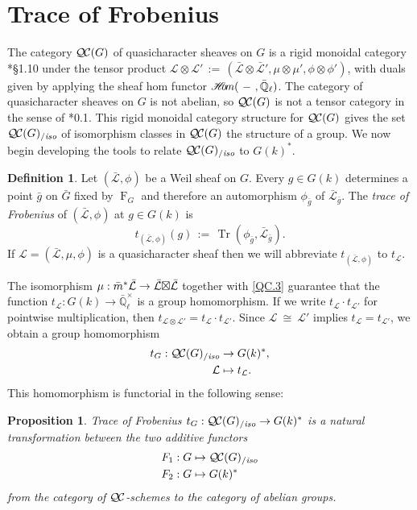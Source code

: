 \documentclass[11pt]{amsart}
\theoremstyle{plain}
\newtheorem{proposition}[theorem]{Proposition}
\theoremstyle{definition}
\newtheorem{definition}[theorem]{Definition}
\theoremstyle{remark}
\newcommand{\EE}{\mathbb{\bar Q}_\ell}
\newcommand{\Fq}{k}
\newcommand{\EEx}{\EE^\times}
\newcommand{\Frob}[1]{\operatorname{F}_{#1}}
\DeclareMathOperator{\trace}{Tr}
\newcommand{\cdef}[1]{{#1}\index{#1}}
\newcommand{\sheafHom}{{\mathscr{H}\hskip-4pt{\it o}\hskip-2pt{\it m}}}
\newcommand{\ceq}{{\, :=\, }}
\newcommand{\iso}{{\ \cong\ }}
\newcommand{\qcs}[1]{{\mathcal{#1}}}
\newcommand{\gqcs}[1]{{\mathcal{\bar #1}}}
\newcommand{\QC}{{\mathcal{Q\hskip-0.8pt C}}}
\newcommand{\QCiso}[1]{\QC(#1)_{/\textit{iso}}}
\newcommand{\trFrob}[1]{t_{#1}}
\newcommand{\bg}{\bar{g}}
\newcommand{\bm}{\bar{m}}
\newcommand{\bG}{\bar{G}}
\newcommand{\tight}[3]{\hspace{-#1pt}{#2}\hspace{-#3pt}}
\newcommand{\LxL}{\text{$\gqcs{L} \tight{0}{\boxtimes}{0} \gqcs{L}$}}
\begin{document}
\section{Trace of Frobenius}\label{sec:Frob}

The category $\QC(G)$ of quasicharacter sheaves on $G$ is a rigid monoidal category
\cite{etingof:09a}*{\S1.10} under the tensor product
$\qcs{L} \otimes \qcs{L'} \ceq (\gqcs{L}\otimes\gqcs{L'}, \mu\otimes\mu', \phi\otimes \phi')$,
with duals given by applying the sheaf hom functor 
$\sheafHom(\ - \ ,\EE)$.
The category of quasicharacter sheaves on $G$ is not abelian, so $\QC(G)$
is not a tensor category in the sense of \cite{deligne:02a}*{0.1}.
This rigid monoidal category structure for $\QC(G)$ gives the set $\QCiso{G}$
of isomorphism classes in $\QC(G)$ the structure of a group.
We now begin developing the tools to relate $\QCiso{G}$ to $G(\Fq)^*$.

\begin{definition}\label{def:trFrob}
Let $(\gqcs{L},\phi)$ be a Weil sheaf on $G$. Every $g\in G(\Fq)$
determines a point $\bg$ on $\bG$ fixed by $\Frob{G}$ and
therefore an automorphism $\phi_{\bg}$ of $\gqcs{L}_{\bg}$. The \emph{trace of Frobenius} of $(\gqcs{L},\phi)$ at $g\in G(\Fq)$ is 
\[
\trFrob{(\gqcs{L},\phi)}(g) \ceq \trace(\phi_{\bg}, \gqcs{L}_{\bg}).
\]
If $\qcs{L} = (\gqcs{L},\mu,\phi)$ is a quasicharacter sheaf
then we will abbreviate $\trFrob{(\gqcs{L},\phi)}$ to $\trFrob{\qcs{L}}$.
\end{definition}

The isomorphism $\mu : \bm^* \gqcs{L} \to \LxL$ together with 
\ref{QC.3} guarantee
that the function $\trFrob{\qcs{L}} : G(\Fq)\to \EEx$ is a group homomorphism.  If we write
$\trFrob{\qcs{L}} \cdot \trFrob{\qcs{L'}}$ for pointwise multiplication, then 
 $\trFrob{\qcs{L}\otimes \qcs{L'}} = \trFrob{\qcs{L}} \cdot \trFrob{\qcs{L'}}$.
Since $\qcs{L} \iso \qcs{L'}$ implies $\trFrob{\qcs{L}} = \trFrob{\qcs{L'}}$,
we obtain a group homomorphism
\begin{align*}
\cdef{\trFrob{G}} : \QCiso{G} &\to G(\Fq)^*, \\
\qcs{L} &\mapsto \trFrob{\qcs{L}}.
\end{align*}
This homomorphism is functorial in the following sense:

\begin{proposition}\label{prop:functorialG}
Trace of Frobenius $\trFrob{G} : \QCiso{G} \to G(\Fq)^*$ is a natural transformation 
between the two additive functors 
\begin{align*}
F_1 : G &\mapsto \QCiso{G} \\
F_2 : G &\mapsto G(\Fq)^*
\end{align*}
from the category of $\QC$-schemes to the category of abelian groups.
\end{proposition}
\end{document}
